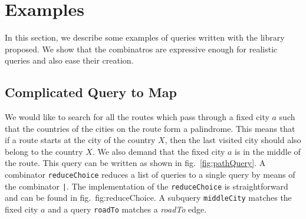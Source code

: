 \section{Examples}
\label{sec:examples}

In this section, we describe some examples of queries written with the library proposed.
We show that the combinatros are expressive enough for realistic queries and also ease their creation.


\subsection{Complicated Query to Map}

We would like to search for all the routes which pass through a fixed city $a$ such that the countries of the cities on the route form a palindrome. 
This means that if a route starts at the city of the country $X$, then the last visited city should also belong to the country $X$. 
We also demand that the fixed city $a$ is in the middle of the route. 
This query can be written as shown in fig.~\ref{fig:pathQuery}.
A combinator \lstinline{reduceChoice} reduces a list of queries to a single query by means of the combinator \lstinline{|}.
The implementation of the \lstinline{reduceChoice} is straightforward and can be found in fig.~{fig:reduceChoice}. 
A subquery \lstinline{middleCity} matches the fixed city $a$ and a query \lstinline{roadTo} matches a \emph{roadTo} edge.

%

